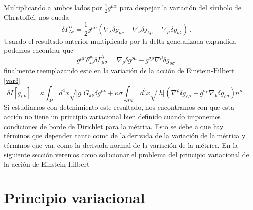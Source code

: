 \documentclass[../Main.tex]{subfiles}
\begin{document}
Multiplicando a ambos lados por $\frac{1}{2}g^{\mu\alpha}$ para despejar la variación del símbolo de Christoffel, nos queda
\begin{equation}
    \delta\Gamma^{\alpha}_{\lambda\nu}=\frac{1}{2}g^{\mu\alpha}\left(\nabla_{\lambda}\delta g_{\mu\nu}+\nabla_{\nu}\delta g_{\lambda\mu}-\nabla_{\mu}\delta g_{\nu\lambda}\right) \, . \label{varchrr}
\end{equation}
Usando el resultado anterior multiplicado por la delta generalizada expandida podemos encontrar que
\begin{equation}
g^{\mu\nu}\delta^{\rho\sigma}_{\lambda\nu}\delta\Gamma^{\lambda}_{\mu\sigma}=\nabla_{\rho}\delta g^{\rho\mu}-g^{\sigma\rho}\nabla^{\mu}\delta g_{\rho\sigma}\,
\end{equation}
finalmente reemplazando esto en la variación de la acción de Einstein-Hilbert \eqref{var3}
\begin{equation}
    \delta I[g_{\mu\nu}] =\kappa\int_{\mathcal{M}}d^{4}x \sqrt{\lvert g\rvert}G_{\mu\nu}\delta g^{\mu\nu}+\kappa\sigma\int_{\partial\mathcal{M}}d^{3}x \sqrt{\lvert h\rvert}\left(\nabla^{\rho}\delta g_{\rho\mu}-g^{\sigma\rho}\nabla_{\mu}\delta g_{\rho\sigma}\right)n^{\mu}\, . \label{varfin}
\end{equation}
Si estudiamos con detenimiento este resultado, nos encontramos con que esta acción no tiene un principio variacional bien definido cuando imponemos condiciones de borde de Dirichlet para la métrica. Esto se debe a que hay términos que dependen tanto como de la derivada de la variación de la métrica y términos que van como la derivada normal de la variación de la métrica. En la siguiente sección veremos como solucionar el problema del principio variacional de la acción de Einstein-Hilbert.




\section{Principio variacional}
\end{document}
